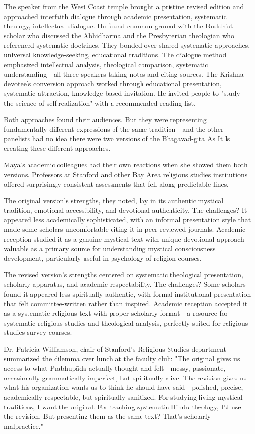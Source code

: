 \documentclass[12pt,twoside]{book}
\begin{document}
The speaker from the West Coast temple brought a pristine revised edition and approached interfaith dialogue through academic presentation, systematic theology, intellectual dialogue. He found common ground with the Buddhist scholar who discussed the Abhidharma and the Presbyterian theologian who referenced systematic doctrines. They bonded over shared systematic approaches, universal knowledge-seeking, educational traditions. The dialogue method emphasized intellectual analysis, theological comparison, systematic understanding—all three speakers taking notes and citing sources. The Krishna devotee's conversion approach worked through educational presentation, systematic attraction, knowledge-based invitation. He invited people to "study the science of self-realization" with a recommended reading list.

Both approaches found their audiences. But they were representing fundamentally different expressions of the same tradition—and the other panelists had no idea there were two versions of the Bhagavad-gītā As It Is creating these different approaches.

Maya's academic colleagues had their own reactions when she showed them both versions. Professors at Stanford and other Bay Area religious studies institutions offered surprisingly consistent assessments that fell along predictable lines.

The original version's strengths, they noted, lay in its authentic mystical tradition, emotional accessibility, and devotional authenticity. The challenges? It appeared less academically sophisticated, with an informal presentation style that made some scholars uncomfortable citing it in peer-reviewed journals. Academic reception studied it as a genuine mystical text with unique devotional approach—valuable as a primary source for understanding mystical consciousness development, particularly useful in psychology of religion courses.

The revised version's strengths centered on systematic theological presentation, scholarly apparatus, and academic respectability. The challenges? Some scholars found it appeared less spiritually authentic, with formal institutional presentation that felt committee-written rather than inspired. Academic reception accepted it as a systematic religious text with proper scholarly format—a resource for systematic religious studies and theological analysis, perfectly suited for religious studies survey courses.

Dr. Patricia Williamson, chair of Stanford's Religious Studies department, summarized the dilemma over lunch at the faculty club: "The original gives us access to what Prabhupāda actually thought and felt—messy, passionate, occasionally grammatically imperfect, but spiritually alive. The revision gives us what his organization wants us to think he should have said—polished, precise, academically respectable, but spiritually sanitized. For studying living mystical traditions, I want the original. For teaching systematic Hindu theology, I'd use the revision. But presenting them as the same text? That's scholarly malpractice."
\end{document}

